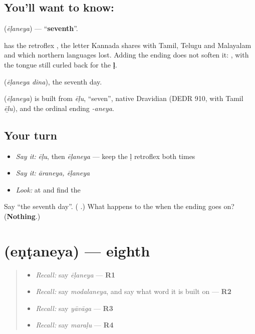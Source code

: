 \subsection*{You'll want to know: }
\textbf{} (\emph{ēḷaneya}) — \textquotedblleft{}\textbf{seventh}\textquotedblright{}.

\textbf{} has the retroflex \textbf{}, the letter Kannada shares with Tamil, Telugu and Malayalam and which northern languages lost. Adding the ending does not soften it: \textbf{}, with the tongue still curled back for the \textbf{ḷ}.

\textbf{ } (\emph{ēḷaneya dina}), the seventh day.

\begin{cousinweb}
\textbf{} (\emph{ēḷaneya}) is built from \emph{ēḷu}, \textquotedblleft{}seven\textquotedblright{}, native Dravidian (DEDR 910, with Tamil \emph{ēḻu}), and the ordinal ending \emph{-aneya}.
\end{cousinweb}

\subsection*{Your turn}
\begin{itemize}
\raggedright
  \item \emph{Say it:} \emph{ēḷu}, then \emph{ēḷaneya} — keep the ḷ retroflex both times
  \item \emph{Say it:} \emph{āraneya, ēḷaneya}
  \item \emph{Look:} at  and find the 
\end{itemize}

\begin{tcolorbox}[breakable,colback=teal!4,colframe=teal!35!black,title={Before you move on}]
Say \textquotedblleft{}the seventh day\textquotedblright{}. (\textbf{ }.) What happens to the  when the ending goes on? (\textbf{Nothing}.)
\end{tcolorbox}
\section[\texorpdfstring{\kn{ಎಂಟನೆಯ} (eṇṭaneya)}{ಎಂಟನೆಯ (eṇṭaneya)}]{ (eṇṭaneya) — eighth}

\label{lesson:KA-C75-eighth}



\begin{quote}
\begin{itemize}
\raggedright
  \item \emph{Recall:} say \emph{ēḷaneya} — \textbf{R1}
  \item \emph{Recall:} say \emph{modalaneya}, and say what word it is built on — \textbf{R2}
  \item \emph{Recall:} say \emph{yāvāga} — \textbf{R3}
  \item \emph{Recall:} say \emph{maraḷu} — \textbf{R4}
\end{itemize}
\end{quote}

